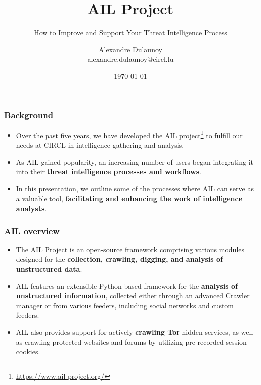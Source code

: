 \documentclass{beamer}
\author{\large{Alexandre Dulaunoy}\\ \scriptsize{alexandre.dulaunoy@circl.lu}}
\title{AIL Project}
\subtitle{How to Improve and Support Your Threat Intelligence Process}
\institute{info@circl.lu}
\date{\today}
\begin{document}
\begin{frame}[t,plain]
\titlepage
\end{frame}

\begin{frame}
   \frametitle{Background}
\begin{itemize}
    \item Over the past five years, we have developed the AIL project\footnote{\url{https://www.ail-project.org/}} to fulfill our needs at CIRCL in intelligence gathering and analysis.
    \item As AIL gained popularity, an increasing number of users began integrating it into their {\bf threat intelligence processes and workflows}.
    \item In this presentation, we outline some of the processes where AIL can serve as a valuable tool, {\bf facilitating and enhancing the work of intelligence analysts}.
\end{itemize}
\end{frame}

\begin{frame}
   \frametitle{AIL overview}
    \begin{itemize}
        \item The AIL Project is an open-source framework comprising various modules designed for the {\bf collection, crawling, digging, and analysis of unstructured data}.
        \item AIL features an extensible Python-based framework for the {\bf analysis of unstructured information}, collected either through an advanced Crawler manager or from various feeders, including social networks and custom feeders.
        \item AIL also provides support for actively {\bf crawling Tor} hidden services, as well as crawling protected websites and forums by utilizing pre-recorded session cookies.
    \end{itemize}
\end{frame}
\end{document}
